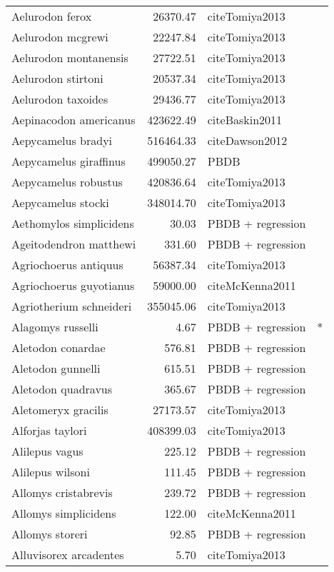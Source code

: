 \begin{table}[ht]
\begin{tabular}{lrll}
  Aelurodon ferox & 26370.47 & cite{Tomiya2013} &  \\ 
  Aelurodon mcgrewi & 22247.84 & cite{Tomiya2013} &  \\ 
  Aelurodon montanensis & 27722.51 & cite{Tomiya2013} &  \\ 
  Aelurodon stirtoni & 20537.34 & cite{Tomiya2013} &  \\ 
  Aelurodon taxoides & 29436.77 & cite{Tomiya2013} &  \\ 
  Aepinacodon americanus & 423622.49 & cite{Baskin2011} &  \\ 
  Aepycamelus bradyi & 516464.33 & cite{Dawson2012} &  \\ 
  Aepycamelus giraffinus & 499050.27 & PBDB &  \\ 
  Aepycamelus robustus & 420836.64 & cite{Tomiya2013} &  \\ 
  Aepycamelus stocki & 348014.70 & cite{Tomiya2013} &  \\ 
  Aethomylos simplicidens & 30.03 & PBDB + regression &  \\ 
  Ageitodendron matthewi & 331.60 & PBDB + regression &  \\ 
  Agriochoerus antiquus & 56387.34 & cite{Tomiya2013} &  \\ 
  Agriochoerus guyotianus & 59000.00 & cite{McKenna2011} &  \\ 
  Agriotherium schneideri & 355045.06 & cite{Tomiya2013} &  \\ 
  Alagomys russelli & 4.67 & PBDB + regression & * \\ 
  Aletodon conardae & 576.81 & PBDB + regression &  \\ 
  Aletodon gunnelli & 615.51 & PBDB + regression &  \\ 
  Aletodon quadravus & 365.67 & PBDB + regression &  \\ 
  Aletomeryx gracilis & 27173.57 & cite{Tomiya2013} &  \\ 
  Alforjas taylori & 408399.03 & cite{Tomiya2013} &  \\ 
  Alilepus vagus & 225.12 & PBDB + regression &  \\ 
  Alilepus wilsoni & 111.45 & PBDB + regression &  \\ 
  Allomys cristabrevis & 239.72 & PBDB + regression &  \\ 
  Allomys simplicidens & 122.00 & cite{McKenna2011} &  \\ 
  Allomys storeri & 92.85 & PBDB + regression &  \\ 
  Alluvisorex arcadentes & 5.70 & cite{Tomiya2013} &  \\ 

\end{tabular}
\end{table}
